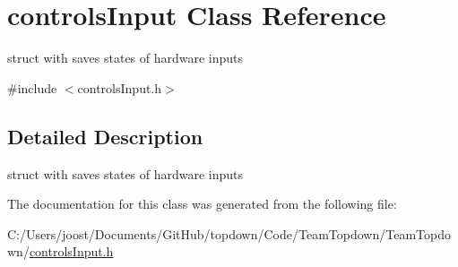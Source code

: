 \hypertarget{classcontrols_input}{}\section{controls\+Input Class Reference}
\label{classcontrols_input}


struct with saves states of hardware inputs  




{\ttfamily \#include $<$controls\+Input.\+h$>$}



\subsection{Detailed Description}
struct with saves states of hardware inputs 

The documentation for this class was generated from the following file\+:\begin{DoxyCompactItemize}
\item 
C\+:/\+Users/joost/\+Documents/\+Git\+Hub/topdown/\+Code/\+Team\+Topdown/\+Team\+Topdown/\hyperlink{controls_input_8h}{controls\+Input.\+h}\end{DoxyCompactItemize}
